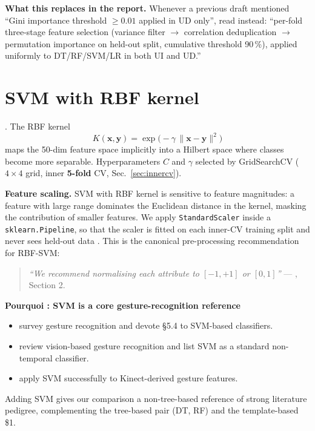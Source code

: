 \documentclass[11pt,a4paper]{article}
\newenvironment{whybox}[1]{%
    \begin{shaded*}\noindent\textbf{Pourquoi : #1}\par\vspace{0.3em}}
    {\end{shaded*}}
\renewenvironment{shaded*}
    {\definecolor{shadecolor}{named}{whyboxbg}\begin{shaded}}
    {\end{shaded}}
\begin{document}
\textbf{What this replaces in the report.} Whenever a previous draft
mentioned ``Gini importance threshold $\geq 0.01$ applied in UD only'',
read instead: ``per-fold three-stage feature selection (variance filter
$\to$ correlation deduplication $\to$ permutation importance on
held-out split, cumulative threshold 90\,\%), applied uniformly to
DT/RF/SVM/LR in both UI and UD.''

\section{SVM with RBF kernel}

\cite{cortes1995svm, scholkopf2002learning}. The RBF kernel
\[
K(\mathbf{x},\mathbf{y}) = \exp\bigl(-\gamma\,\|\mathbf{x}-\mathbf{y}\|^2\bigr)
\]
maps the 50-dim feature space implicitly into a Hilbert space where
classes become more separable.  Hyperparameters $C$ and $\gamma$
selected by GridSearchCV ($4{\times}4$ grid, inner \textbf{5-fold} CV,
Sec.~\ref{sec:innercv}).

\textbf{Feature scaling.}  SVM with RBF kernel is sensitive to
feature magnitudes: a feature with large range dominates the Euclidean
distance in the kernel, masking the contribution of smaller features.
We apply \texttt{StandardScaler} inside a \texttt{sklearn.Pipeline},
so that the scaler is fitted on each inner-CV training split and never
sees held-out data \cite{hsuchang2010guide}.  This is the canonical
pre-processing recommendation for RBF-SVM:
\begin{quote}
\emph{``We recommend normalising each attribute to $[{-}1,+1]$ or
$[0,1]$''} --- \cite{hsuchang2010guide}, Section 2.
\end{quote}

\begin{whybox}{SVM is a core gesture-recognition reference}
\begin{itemize}[itemsep=0.1em,topsep=0.2em]
\item \cite{mitra2007survey} survey gesture recognition and devote
      §5.4 to SVM-based classifiers.
\item \cite{wuhuang1999vision} review vision-based gesture
      recognition and list SVM as a standard non-temporal classifier.
\item \cite{bhattacharya2014kinect} apply SVM successfully to
      Kinect-derived gesture features.
\end{itemize}
Adding SVM gives our comparison a non-tree-based reference of strong
literature pedigree, complementing the tree-based pair (DT, RF) and the
template-based \$1.
\end{whybox}
\end{document}

